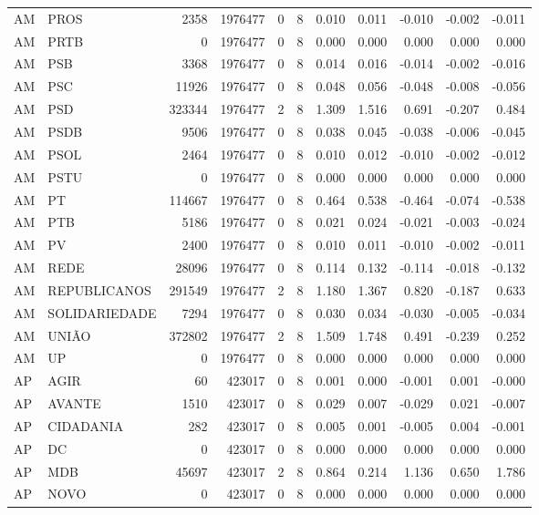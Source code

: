 \begin{landscape}
\begin{longtable}{llrrrrrrrrr}
AM & PROS & 2358 & 1976477 & 0 & 8 & 0.010 & 0.011 & -0.010 & -0.002 & -0.011 \\
AM & PRTB & 0 & 1976477 & 0 & 8 & 0.000 & 0.000 & 0.000 & 0.000 & 0.000 \\
AM & PSB & 3368 & 1976477 & 0 & 8 & 0.014 & 0.016 & -0.014 & -0.002 & -0.016 \\
AM & PSC & 11926 & 1976477 & 0 & 8 & 0.048 & 0.056 & -0.048 & -0.008 & -0.056 \\
AM & PSD & 323344 & 1976477 & 2 & 8 & 1.309 & 1.516 & 0.691 & -0.207 & 0.484 \\
AM & PSDB & 9506 & 1976477 & 0 & 8 & 0.038 & 0.045 & -0.038 & -0.006 & -0.045 \\
AM & PSOL & 2464 & 1976477 & 0 & 8 & 0.010 & 0.012 & -0.010 & -0.002 & -0.012 \\
AM & PSTU & 0 & 1976477 & 0 & 8 & 0.000 & 0.000 & 0.000 & 0.000 & 0.000 \\
AM & PT & 114667 & 1976477 & 0 & 8 & 0.464 & 0.538 & -0.464 & -0.074 & -0.538 \\
AM & PTB & 5186 & 1976477 & 0 & 8 & 0.021 & 0.024 & -0.021 & -0.003 & -0.024 \\
AM & PV & 2400 & 1976477 & 0 & 8 & 0.010 & 0.011 & -0.010 & -0.002 & -0.011 \\
AM & REDE & 28096 & 1976477 & 0 & 8 & 0.114 & 0.132 & -0.114 & -0.018 & -0.132 \\
AM & REPUBLICANOS & 291549 & 1976477 & 2 & 8 & 1.180 & 1.367 & 0.820 & -0.187 & 0.633 \\
AM & SOLIDARIEDADE & 7294 & 1976477 & 0 & 8 & 0.030 & 0.034 & -0.030 & -0.005 & -0.034 \\
AM & UNIÃO & 372802 & 1976477 & 2 & 8 & 1.509 & 1.748 & 0.491 & -0.239 & 0.252 \\
AM & UP & 0 & 1976477 & 0 & 8 & 0.000 & 0.000 & 0.000 & 0.000 & 0.000 \\
AP & AGIR & 60 & 423017 & 0 & 8 & 0.001 & 0.000 & -0.001 & 0.001 & -0.000 \\
AP & AVANTE & 1510 & 423017 & 0 & 8 & 0.029 & 0.007 & -0.029 & 0.021 & -0.007 \\
AP & CIDADANIA & 282 & 423017 & 0 & 8 & 0.005 & 0.001 & -0.005 & 0.004 & -0.001 \\
AP & DC & 0 & 423017 & 0 & 8 & 0.000 & 0.000 & 0.000 & 0.000 & 0.000 \\
AP & MDB & 45697 & 423017 & 2 & 8 & 0.864 & 0.214 & 1.136 & 0.650 & 1.786 \\
AP & NOVO & 0 & 423017 & 0 & 8 & 0.000 & 0.000 & 0.000 & 0.000 & 0.000 \\

\end{longtable}
\end{landscape}
